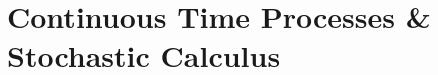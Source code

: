 \documentclass[12pt]{article}
\theoremstyle{plain}
\theoremstyle{definition}
\theoremstyle{remark}
\begin{document}




\clearpage
\section{Continuous Time Processes \& Stochastic Calculus}

\end{document}
